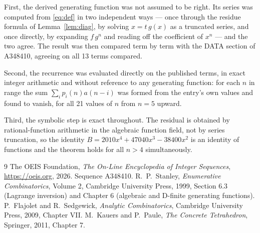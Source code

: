 \documentclass[11pt,a4paper]{article}
\theoremstyle{plain}
\theoremstyle{definition}
\begin{document}
First, the derived generating function was not assumed to be right. Its series was
computed from \eqref{eq:def} in two independent ways --- once through the residue formula
of Lemma~\ref{lem:diag}, by solving $x=t\,g(x)$ as a truncated series, and once directly,
by expanding $f\,g^{n}$ and reading off the coefficient of $x^{n}$ --- and the two agree.
The result was then compared term by term with the DATA section of A348410, agreeing on
all 13 terms compared.

Second, the recurrence was evaluated directly on the published terms, in exact integer
arithmetic and without reference to any generating function: for each $n$ in range the sum
$\sum_{i}p_{i}(n)a(n-i)$ was formed from the entry's own values and found to vanish, for
all 21 values of $n$ from $n=5$ upward.

Third, the symbolic step is exact throughout. The residual is obtained by
rational-function arithmetic in the algebraic function field, not by series truncation, so
the identity $B=2010 x^{4} + 47040 x^{3} - 38400 x^{2}$ is an identity of functions and the theorem holds for all
$n>4$ simultaneously.

\begin{thebibliography}{9}
 The OEIS Foundation, \emph{The On-Line Encyclopedia of Integer Sequences},
\url{https://oeis.org}, 2026. Sequence A348410.
 R.~P.~Stanley, \emph{Enumerative Combinatorics}, Volume 2, Cambridge
University Press, 1999, Section 6.3 (Lagrange inversion) and Chapter 6 (algebraic and
D-finite generating functions).
 P.~Flajolet and R.~Sedgewick, \emph{Analytic Combinatorics}, Cambridge
University Press, 2009, Chapter VII.
 M.~Kauers and P.~Paule, \emph{The Concrete Tetrahedron}, Springer, 2011,
Chapter 7.
\end{thebibliography}
\end{document}
